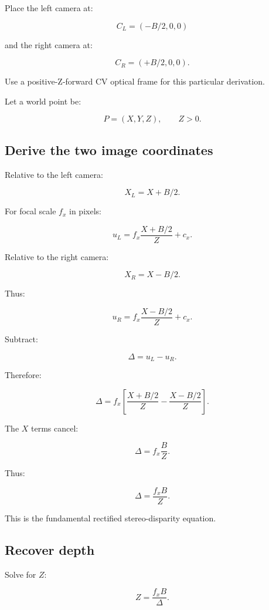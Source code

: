 Place the left camera at:

\[ C_L=(-B/2,0,0) \]

and the right camera at:

\[ C_R=(+B/2,0,0). \]

Use a positive-Z-forward CV optical frame for this particular derivation.

Let a world point be:

\[ P=(X,Y,Z),\qquad Z>0. \]

\subsection{Derive the two image coordinates}\label{02-foundations-ii-ch035-derive-the-two-image-coordinates}

\hypertarget{02-foundations-ii-ch035-derive-the-two-image-coordinates}{}

Relative to the left camera:

\[ X_L=X+B/2. \]

For focal scale \(f_x\) in pixels:

\[ \boxed{ u_L=f_x\frac{X+B/2}{Z}+c_x. } \]

Relative to the right camera:

\[ X_R=X-B/2. \]

Thus:

\[ \boxed{ u_R=f_x\frac{X-B/2}{Z}+c_x. } \]

Subtract:

\[ \Delta=u_L-u_R. \]

Therefore:

\[ \Delta = f_x \left[ \frac{X+B/2}{Z} - \frac{X-B/2}{Z} \right]. \]

The \(X\) terms cancel:

\[ \Delta=f_x\frac BZ. \]

Thus:

\[ \boxed{ \Delta=\frac{f_xB}{Z}. } \]

This is the fundamental rectified stereo-disparity equation.

\subsection{Recover depth}\label{02-foundations-ii-ch035-recover-depth}

\hypertarget{02-foundations-ii-ch035-recover-depth}{}

Solve for \(Z\):

\[ \boxed{ Z=\frac{f_xB}{\Delta}. } \]

